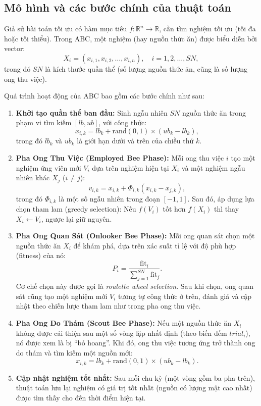 \documentclass[a4paper]{report}
\begin{document}
\subsection{Mô hình và các bước chính của thuật toán}
Giả sử bài toán tối ưu có hàm mục tiêu $f: \mathbb{R}^n \rightarrow \mathbb{R}$, cần tìm nghiệm tối ưu (tối đa hoặc tối thiểu). Trong ABC, một nghiệm (hay nguồn thức ăn) được biểu diễn bởi vector:
\[
X_i = (x_{i,1}, x_{i,2}, \ldots, x_{i,n}), \quad i = 1, 2, \ldots, SN,
\]
trong đó $SN$ là kích thước quần thể (số lượng nguồn thức ăn, cũng là số lượng ong thu việc).

Quá trình hoạt động của ABC bao gồm các bước chính như sau:

\begin{enumerate}
    \item \textbf{Khởi tạo quần thể ban đầu:}  
    Sinh ngẫu nhiên $SN$ nguồn thức ăn trong phạm vi tìm kiếm $[lb, ub]$, với công thức:
    \[
    x_{i,k} = lb_k + \mathrm{rand}(0,1)\times(ub_k - lb_k),
    \]
    trong đó $lb_k$ và $ub_k$ là giới hạn dưới và trên của chiều thứ $k$.

    \item \textbf{Pha Ong Thu Việc (Employed Bee Phase):}  
    Mỗi ong thu việc $i$ tạo một nghiệm ứng viên mới $V_i$ dựa trên nghiệm hiện tại $X_i$ và một nghiệm ngẫu nhiên khác $X_j$ ($i \neq j$):
    \[
    v_{i,k} = x_{i,k} + \Phi_{i,k}(x_{i,k} - x_{j,k}),
    \]
    trong đó $\Phi_{i,k}$ là một số ngẫu nhiên trong đoạn $[-1,1]$.  
    Sau đó, áp dụng lựa chọn tham lam (greedy selection):  
    Nếu $f(V_i)$ tốt hơn $f(X_i)$ thì thay $X_i \leftarrow V_i$, ngược lại giữ nguyên.

    \item \textbf{Pha Ong Quan Sát (Onlooker Bee Phase):}  
    Mỗi ong quan sát chọn một nguồn thức ăn $X_i$ để khám phá, dựa trên xác suất tỉ lệ với độ phù hợp (fitness) của nó:
    \[
    P_i = \frac{\mathrm{fit}_i}{\sum_{j=1}^{SN} \mathrm{fit}_j}.
    \]
    Cơ chế chọn này được gọi là \textit{roulette wheel selection}. Sau khi chọn, ong quan sát cũng tạo một nghiệm mới $V_i$ tương tự công thức ở trên, đánh giá và cập nhật theo chiến lược tham lam như trong pha ong thu việc.

    \item \textbf{Pha Ong Do Thám (Scout Bee Phase):}  
    Nếu một nguồn thức ăn $X_i$ không được cải thiện sau một số vòng lặp nhất định (theo biến đếm $trial_i$), nó được xem là bị “bỏ hoang”. Khi đó, ong thu việc tương ứng trở thành ong do thám và tìm kiếm một nguồn mới:
    \[
    x_{i,k} = lb_k + \mathrm{rand}(0,1)\times(ub_k - lb_k).
    \]

    \item \textbf{Cập nhật nghiệm tốt nhất:}  
    Sau mỗi chu kỳ (một vòng gồm ba pha trên), thuật toán lưu lại nghiệm có giá trị tốt nhất (nguồn có lượng mật cao nhất) được tìm thấy cho đến thời điểm hiện tại.
\end{enumerate}
\end{document}
